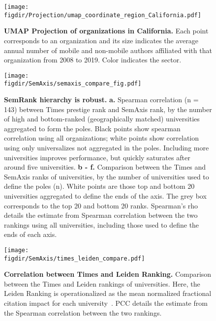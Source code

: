 \documentclass[12pt]{article} %
\def\figdir{../Figs}
\begin{document}
%
%
\begin{figure}[hp!]
	\centering
	\texttt{[image: \\figdir/Projection/umap\_coordinate\_region\_California.pdf]}
	\caption{
		\textbf{UMAP Projection of organizations in California.}
		Each point corresponds to an organization and its size indicates the average annual number of mobile and non-mobile authors affiliated with that organization from 2008 to 2019. 
		Color indicates the sector. 
	}
	\label{fig:supp:proj_california}
\end{figure}




%
%
\begin{figure}[hp!]
	\centering
	\texttt{[image: \\figdir/SemAxis/semaxis\_compare\_fig.pdf]}
	\caption{
		\textbf{SemRank hierarchy is robust.}
		\textbf{a.} Spearman correlation (n = 143) between Times prestige rank and SemAxis rank, by the number of high and bottom-ranked (geographically matched) universities aggregated to form the poles.
		Black points show spearman correlation using all organizations; white points show correlation using only universalizes not aggregated in the poles. 
		Including more universities improves performance, but quickly saturates after around five universities.
		\textbf{b - f.} Comparison between the Times and SemAxis ranks of universities, by the number of universities used to define the poles (n).
		White points are those top and bottom 20 universities aggregated to define the ends of the axis.
		The grey box corresponds to the top 20 and bottom 20 ranks.
	  	Spearman's rho details the estimate from Spearman correlation between the two rankings using all universities, including those used to define the ends of each axis. 
	}
	\label{fig:supp:semaxis_compare}
\end{figure}



%
%
\begin{figure}[hp!]
	\centering
	\texttt{[image: \\figdir/SemAxis/times\_leiden\_compare.pdf]}
	\caption{
		\textbf{Correlation between Times and Leiden Ranking.}
		Comparison between the Times and Leiden rankings of universities.
		Here, the Leiden Ranking is operationalized as the mean normalized fractional citation impact for each university~\autocite{waltman2012leidenrankings}. 
	  	PCC details the estimate from the Spearman correlation between the two rankings.
	}
	\label{fig:supp:times_vs_leiden}
\end{figure}
\end{document}
